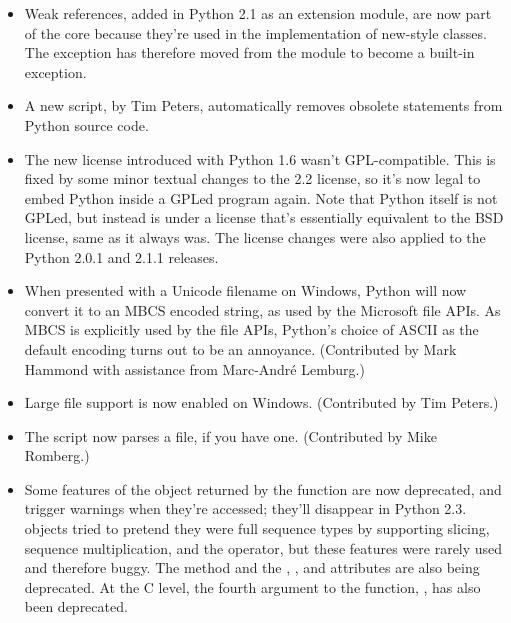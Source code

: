 \documentclass{howto}
\begin{document}
\begin{itemize}
  \item Weak references, added in Python 2.1 as an extension module,
  are now part of the core because they're used in the implementation
  of new-style classes.  The  exception has
  therefore moved from the  module to become a
  built-in exception.

  \item A new script,  by Tim
  Peters, automatically removes obsolete  statements
  from Python source code.

  \item The new license introduced with Python 1.6 wasn't
  GPL-compatible.  This is fixed by some minor textual changes to the
  2.2 license, so it's now legal to embed Python inside a GPLed
  program again.  Note that Python itself is not GPLed, but instead is
  under a license that's essentially equivalent to the BSD license,
  same as it always was.  The license changes were also applied to the
  Python 2.0.1 and 2.1.1 releases.

  \item When presented with a Unicode filename on Windows, Python will
  now convert it to an MBCS encoded string, as used by the Microsoft
  file APIs.  As MBCS is explicitly used by the file APIs, Python's
  choice of ASCII as the default encoding turns out to be an
  annoyance.
  (Contributed by Mark Hammond with assistance from Marc-Andr\'e
  Lemburg.)

  \item Large file support is now enabled on Windows.  (Contributed by
  Tim Peters.)

  \item The  script
  now parses a  file, if you have one.
  (Contributed by Mike Romberg.) 

  \item Some features of the object returned by the
   function are now deprecated, and trigger
  warnings when they're accessed; they'll disappear in Python 2.3.
   objects tried to pretend they were full sequence
  types by supporting slicing, sequence multiplication, and the
   operator, but these features were rarely used and
  therefore buggy.  The  method and the
  , , and  attributes are also
  being deprecated.  At the C level, the fourth argument to the
   function, , has also been
  deprecated.


\end{itemize}
\end{document}
